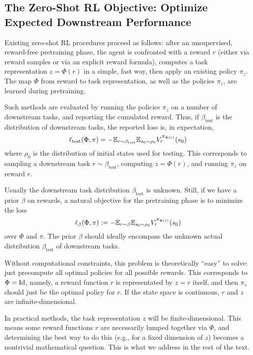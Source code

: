 \documentclass[11pt,a4paper]{article}
\newcommand{\betatest}{\beta_{\mathrm{test}}}
\newcommand{\losstest}{\ell_{\mathrm{test}}}
\begin{document}
\subsection{The Zero-Shot RL Objective: Optimize Expected Downstream
Performance}

Existing zero-shot RL procedures proceed as follows: after an unsupervised,
reward-free pretraining phase, the agent is confronted with a reward $r$
(either via reward samples or via an explicit reward formula), computes a
task representation $z=\Phi(r)$ in a simple, fast way, then apply an
existing policy $\pi_z$. The map $\Phi$ from reward to task
representation, as well as the policies $\pi_z$, are learned during
pretraining.

Such methods are evaluated by running the policies $\pi_z$ on a number of
downstream tasks, and reporting the cumulated reward. Thus, if
$\betatest$ is the distribution of downstream tasks, the reported
loss is, in expectation,
\begin{equation}
\losstest(\Phi,\pi)= -\E_{r\sim \betatest} \E_{s_0\sim \rho_0}
V_r^{\pi_{\Phi(r)}}(s_0)
\end{equation}
where $\rho_0$ is the distribution of initial states used for testing.
This corresponds to
sampling a downstream task $r \sim \betatest$, computing $z=\Phi(r)$, and
running $\pi_z$ on reward $r$.

Usually the downstream task distribution $\betatest$ is unknown. Still, if we have a prior $\beta$ on rewards, a natural objective for
the pretraining phase is to minimize the loss
\begin{equation}
\label{eq:mainloss}
\ell_\beta(\Phi,\pi)\mathrel{\mathop{:}}= -\mathbb{E}_{r\sim \beta} \mathbb{E}_{s_0\sim \rho_0}
V_r^{\pi_{\Phi(r)}}(s_0)
\end{equation}
over $\Phi$ and $\pi$. The prior $\beta$ should ideally encompass the
unknown actual distribution $\betatest$ of downstream tasks.

Without computational constraints, this problem is theoretically ``easy'' to solve:
just precompute all optimal policies for all possible rewards. This
corresponds to $\Phi=\operatorname{Id}$, namely, a reward function $r$ is representated
by $z=r$ itself, and then $\pi_z$ should just be the optimal policy for
$r$. If the state space is continuous, $r$ and $z$ are
infinite-dimensional.

In practical methods, the task representation $z$ will be
finite-dimensional. This means some reward functions $r$ are necessarily
lumped together via $\Phi$, and determining the best way to do this
(e.g., for a fixed dimension of $z$)
becomes a nontrivial mathematical question. This is what we address in
the rest of the text.
\end{document}

